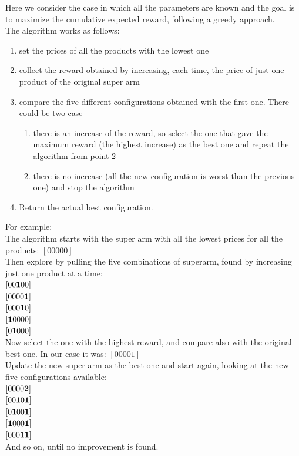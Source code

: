 Here we consider the case in which all the parameters are known and the goal is to maximize the cumulative expected reward, following a greedy approach.\\
The algorithm works as follows:
\begin{enumerate}
    \item set the prices of all the products with the lowest one
    \item collect the reward obtained by increasing, each time, the price of just one product of the original super arm
    \item compare the five different configurations obtained with the first one. There could be two case\begin{enumerate}
        \item there is an increase of the reward, so select the one that gave the maximum reward (the highest increase) as the best one and repeat the algorithm from point 2
        \item there is no increase (all the new configuration is worst than the previous one) and stop the algorithm
    \end{enumerate}
    \item Return the actual best configuration.
\end{enumerate}
For example:\\
The algorithm starts with the super arm with all the lowest prices for all the products: $[0 0 0 0 0]$\\
Then explore by pulling the five combinations of superarm, found by increasing just one product at a time: \\
$[0 0 {\bf1} 0 0]$\\
$[0 0 0 0 {\bf1}]$\\
$[0 0 0 {\bf1} 0]$\\
$[{\bf1} 0 0 0 0]$\\
$[0 {\bf1} 0 0 0]$\\
Now select the one with the highest reward, and compare also with the original best one. In our case it was: $[0 0 0 0 1]$\\ Update the new super arm as the best one and start again, looking at the new five configurations available:\\
$[0 0 0 0 {\bf2}]$\\
$[0 0 {\bf1} 0 {\bf1}]$\\
$[0 {\bf1} 0 0 {\bf1}]$\\
$[{\bf1} 0 0 0 {\bf1}]$\\
$[0 0 0 {\bf1} {\bf1}]$\\
And so on, until no improvement is found.
